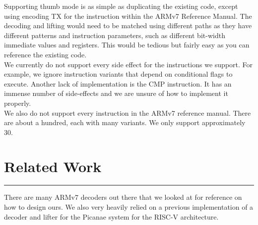 \documentclass{article}
\begin{document}
Supporting thumb mode is as simple as duplicating the existing code, except using encoding TX for the instruction within the ARMv7 Reference Manual. The decoding and lifting would need to be matched using different paths as they have different patterns and instruction parameters, such as different bit-width immediate values and registers. This would be tedious but fairly easy as you can reference the existing code.\\

We currently do not support every side effect for the instructions we support. For example, we ignore instruction variants that depend on conditional flags to execute. Another lack of implementation is the CMP instruction. It has an immense number of side-effects and we are unsure of how to implement it properly.\\

We also do not support every instruction in the ARMv7 reference manual. There are about a hundred, each with many variants. We only support approximately 30.
\pagebreak

\section*{Related Work}
\vspace{0.3cm}
\hrule
\vspace{0.3cm}

There are many ARMv7 decoders out there that we looked at for reference on how to design ours. We also very heavily relied on a previous implementation of a decoder and lifter for the Picanae system for the RISC-V architecture.
\end{document}
